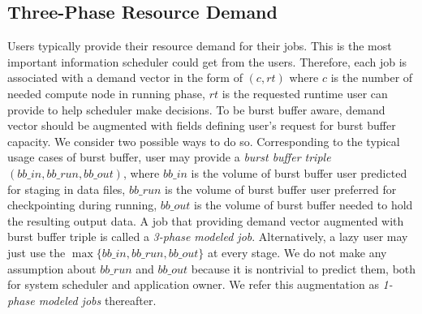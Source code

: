 \subsection{Three-Phase Resource Demand}
Users typically provide their resource demand for their jobs.
This is the most important information scheduler could get from the users.
Therefore, each job is associated with a demand vector in the form of $(c, rt)$
where $c$ is the number of needed compute node in running phase,
$rt$ is the requested runtime user can provide to help scheduler make decisions.
To be burst buffer aware, demand vector should be augmented
with fields defining user's request for burst buffer capacity.
We consider two possible ways to do so.
Corresponding to the typical usage cases of burst buffer,
user may provide a \textit{burst buffer triple} $(bb\_in, bb\_run, bb\_out)$,
where $bb\_in$ is the volume of burst buffer user predicted for staging in data files,
$bb\_run$ is the volume of burst buffer user preferred for checkpointing during running,
$bb\_out$ is the volume of burst buffer needed to hold the resulting output data.
A job that providing demand vector augmented with
burst buffer triple is called a \textit{3-phase modeled job}.
Alternatively, a lazy user may just use the $\max\{bb\_in, bb\_run, bb\_out\}$ at every stage.
We do not make any assumption about $bb\_run$ and $bb\_out$ because it is nontrivial to predict them,
both for system scheduler and application owner.
We refer this augmentation as
\textit{1-phase modeled jobs} thereafter.


